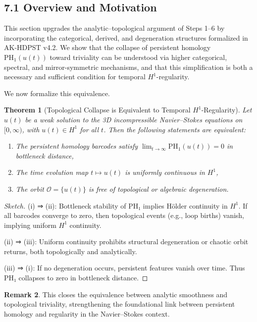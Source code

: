 \documentclass[11pt]{article}
\newtheorem{theorem}{Theorem}[section]
\theoremstyle{definition}
\newtheorem{remark}[theorem]{Remark}
\begin{document}
\subsection*{7.1 Overview and Motivation}

This section upgrades the analytic--topological argument of Steps 1--6 by incorporating the categorical, derived, and degeneration structures formalized in AK-HDPST v4.2. We show that the collapse of persistent homology $\mathrm{PH}_1(u(t))$ toward triviality can be understood via higher categorical, spectral, and mirror-symmetric mechanisms, and that this simplification is both a necessary and sufficient condition for temporal $H^1$-regularity.

We now formalize this equivalence.

\begin{theorem}[Topological Collapse is Equivalent to Temporal $H^1$-Regularity]
Let \( u(t) \) be a weak solution to the 3D incompressible Navier--Stokes equations on \( [0, \infty) \), with \( u(t) \in H^1 \) for all \( t \). Then the following statements are equivalent:
\begin{enumerate}
    \item[\textbf{(i)}] The persistent homology barcodes satisfy \( \lim_{t \to \infty} \mathrm{PH}_1(u(t)) = 0 \) in bottleneck distance,
    \item[\textbf{(ii)}] The time evolution map \( t \mapsto u(t) \) is uniformly continuous in \( H^1 \),
    \item[\textbf{(iii)}] The orbit \( \mathcal{O} = \{ u(t) \} \) is free of topological or algebraic degeneration.
\end{enumerate}
\end{theorem}

\begin{proof}[Sketch]
(i) ⇒ (ii): Bottleneck stability of PH₁ implies H\"older continuity in \( H^1 \). If all barcodes converge to zero, then topological events (e.g., loop births) vanish, implying uniform $H^1$ continuity.

(ii) ⇒ (iii): Uniform continuity prohibits structural degeneration or chaotic orbit returns, both topologically and analytically.

(iii) ⇒ (i): If no degeneration occurs, persistent features vanish over time. Thus PH₁ collapses to zero in bottleneck distance.
\end{proof}

\begin{remark}
This closes the equivalence between analytic smoothness and topological triviality, strengthening the foundational link between persistent homology and regularity in the Navier--Stokes context.
\end{remark}
\end{document}
